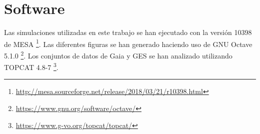 \chapter{Software}\label{ap:software}
Las simulaciones utilizadas en este trabajo se han ejecutado con la versión 10398 de MESA \footnote{\url{http://mesa.sourceforge.net/release/2018/03/21/r10398.html}}. Las diferentes figuras se han generado haciendo uso de GNU Octave 5.1.0 \footnote{\url{https://www.gnu.org/software/octave/}}. Los conjuntos de datos de Gaia y GES se han analizado utilizando TOPCAT 4.8-7 \footnote{\url{https://www.g-vo.org/topcat/topcat/}}. 

\endinput
